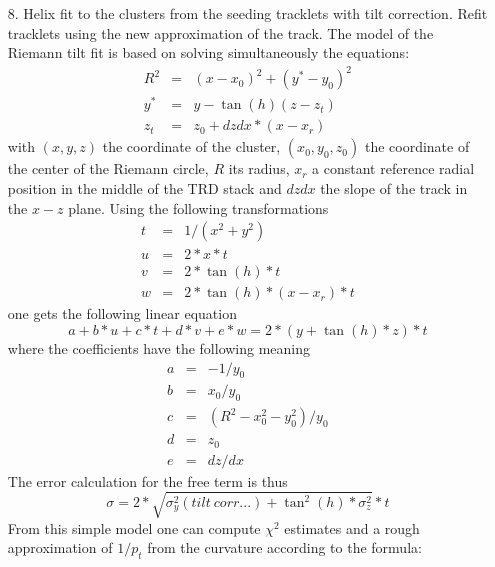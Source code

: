 \documentclass{alicetdr}
\begin{document}
\begin{itemize}
\item[8.] Helix fit to the clusters from the seeding tracklets with tilt correction. 
          Refit tracklets using the new approximation of the track. The model of the 
          Riemann tilt fit is based on solving simultaneously the equations:
          \begin{eqnarray}
          R^{2} &=& (x-x_{0})^{2} + (y^{*}-y_{0})^{2}\\
          y^{*} &=& y - \tan(h)(z - z_{t})\\
          z_{t} &=& z_{0}+dzdx*(x-x_{r})
          \end{eqnarray}
          with $(x, y, z)$ the coordinate of the cluster, $(x_0, y_0, z_0)$ the 
          coordinate of the center of the Riemann circle, $R$ its radius, $x_r$ a 
          constant reference radial position in the middle of the TRD stack and $dzdx$ 
          the slope of the track in the $x-z$ plane. Using the following transformations
          \begin{eqnarray}
          t &=& 1 / (x^{2} + y^{2})\\
          u &=& 2 * x * t\\
          v &=& 2 * \tan(h) * t\\
          w &=& 2 * \tan(h) * (x - x_{r}) * t
          \end{eqnarray}
          one gets the following linear equation
          \begin{equation}
          a + b * u + c * t + d * v  + e * w = 2 * (y + \tan(h) * z) * t
          \end{equation}
          where the coefficients have the following meaning 
          \begin{eqnarray}
          a &=& -1/y_{0}\\
          b &=& x_{0}/y_{0}\\
          c &=& (R^{2} -x_{0}^{2} - y_{0}^{2})/y_{0}\\
          d &=& z_{0}\\
          e &=& dz/dx
          \end{eqnarray}
          The error calculation for the free term is thus
          \begin{equation}
          \sigma = 2 * \sqrt{\sigma^{2}_{y}(tilt\ corr ...) 
                 + \tan^{2}(h) * \sigma^{2}_{z}} * t
          \end{equation}
          From this simple model one can compute $\chi^2$ estimates and a rough 
          approximation of $1/p_t$ from the curvature according to the formula:

\end{itemize}
\end{document}
